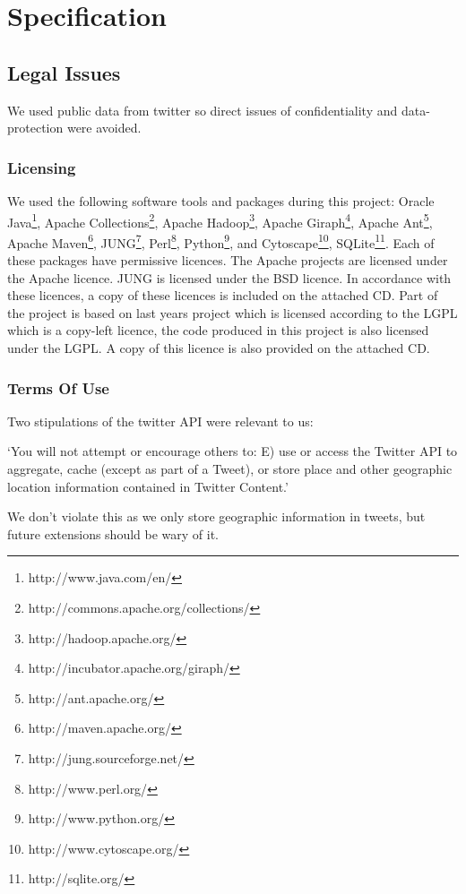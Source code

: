 \chapter{Specification}

\section{Legal Issues}

We used public data from twitter so direct issues of confidentiality and data-protection were avoided.

\subsection{Licensing}

We used the following software tools and packages during this project: Oracle Java\footnote{http://www.java.com/en/}, Apache Collections\footnote{http://commons.apache.org/collections/}, Apache Hadoop\footnote{http://hadoop.apache.org/}, Apache Giraph\footnote{http://incubator.apache.org/giraph/}, Apache Ant\footnote{http://ant.apache.org/}, Apache Maven\footnote{http://maven.apache.org/}, JUNG\footnote{http://jung.sourceforge.net/}, Perl\footnote{http://www.perl.org/}, Python\footnote{http://www.python.org/}, and Cytoscape\footnote{http://www.cytoscape.org/}, SQLite\footnote{http://sqlite.org/}. Each of these packages have permissive licences. The Apache projects are licensed under the Apache licence. JUNG is licensed under the BSD licence. In accordance with these licences, a copy of these licences is included on the attached CD. Part of the project is based on last years project which is licensed according to the LGPL which is a copy-left licence, the code produced in this project is also licensed under the LGPL. A copy of this licence is also provided on the attached CD.

\subsection{Terms Of Use}

Two stipulations of the twitter API were relevant to us:

`You will not attempt or encourage others to: E) use or access the Twitter API to aggregate, 
cache (except as part of a Tweet), or store place and other geographic location information 
contained in Twitter Content.'

We don't violate this as we only store geographic information in tweets, but future extensions should be wary of it.

